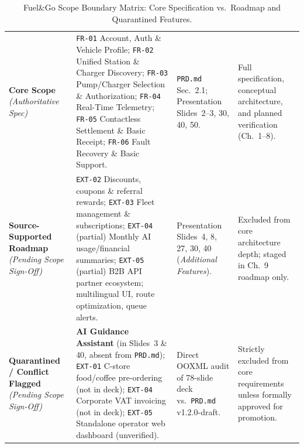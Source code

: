 \begin{table}[htbp]
  \centering
  \caption{Fuel\&Go Scope Boundary Matrix: Core Specification vs.\ Roadmap and Quarantined Features.}
  \label{tab:scope-boundary}
  \small
  \begin{tabularx}{\linewidth}{@{}P{28mm} L P{36mm} P{28mm}@{}}
    \toprule
     &  &  &  \\
    \midrule
    \textbf{Core Scope} \newline \emph{(Authoritative Spec)} &
    \texttt{FR-01} Account, Auth \& Vehicle Profile; \texttt{FR-02} Unified Station \& Charger Discovery; \texttt{FR-03} Pump/Charger Selection \& Authorization; \texttt{FR-04} Real-Time Telemetry; \texttt{FR-05} Contactless Settlement \& Basic Receipt; \texttt{FR-06} Fault Recovery \& Basic Support. &
    \texttt{PRD.md} Sec.~2.1; Presentation Slides~2--3, 30, 40, 50. &
    Full specification, conceptual architecture, and planned verification (Ch.~1--8). \\
    \midrule
    \textbf{Source-Supported Roadmap} \newline \emph{(Pending Scope Sign-Off)} &
    \texttt{EXT-02} Discounts, coupons \& referral rewards; \texttt{EXT-03} Fleet management \& subscriptions; \texttt{EXT-04} (partial) Monthly AI usage/financial summaries; \texttt{EXT-05} (partial) B2B API partner ecosystem; multilingual UI, route optimization, queue alerts. &
    Presentation Slides~4, 8, 27, 30, 40 (\emph{Additional Features}). &
    Excluded from core architecture depth; staged in Ch.~9 roadmap only. \\
    \midrule
    \textbf{Quarantined / Conflict Flagged} \newline \emph{(Pending Scope Sign-Off)} &
    \textbf{AI Guidance Assistant} (in Slides~3 \& 40, absent from \texttt{PRD.md}); \texttt{EXT-01} C-store food/coffee pre-ordering (not in deck); \texttt{EXT-04} Corporate VAT invoicing (not in deck); \texttt{EXT-05} Standalone operator web dashboard (unverified). &
    Direct OOXML audit of 78-slide deck vs.\ \texttt{PRD.md} v1.2.0-draft. &
    Strictly excluded from core requirements unless formally approved for promotion. \\
    \bottomrule
  \end{tabularx}
\end{table}
